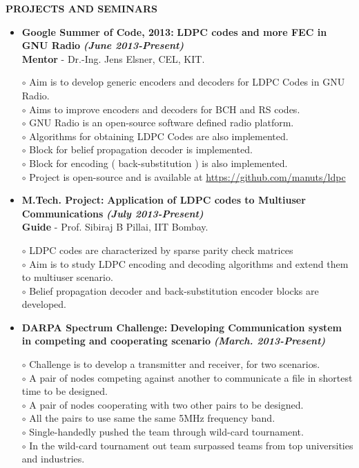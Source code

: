 \documentclass[a4paper,10pt]{article}
\begin{document}
 \colorbox{titleColor}{\parbox{6.5in}{\textbf{PROJECTS AND SEMINARS}}}

 \begin{itemize}
 \setlength{\itemsep}{1pt}
 \item \textbf{Google Summer of Code, 2013:} \textbf{LDPC codes and more FEC in GNU Radio}  \textbf \emph{(June 2013-Present)}\\
        {\textbf{Mentor} - Dr.-Ing. Jens Elsner, CEL, KIT.   }          %

        $\circ$ Aim is to develop generic encoders and decoders for LDPC Codes in GNU Radio. \\
        $\circ$ Aims to improve encoders and decoders for BCH and RS codes. \\
        $\circ$ GNU Radio is an open-source software defined radio platform. \\
        $\circ$ Algorithms for obtaining LDPC Codes are also implemented. \\
        $\circ$ Block for belief propagation decoder is implemented. \\
        $\circ$ Block for encoding ( back-substitution ) is also implemented. \\
        $\circ$ Project is open-source and is available at \url{https://github.com/manuts/ldpc}

        \item \textbf{M.Tech. Project:} \textbf{Application of LDPC codes to Multiuser Communications} \textbf \emph{(July 2013-Present)} \\
        {\textbf{Guide} - Prof. Sibiraj B Pillai, IIT Bombay.}            %
        
$\circ$ LDPC codes are characterized by sparse parity check matrices \\ 
$\circ$ Aim is to study LDPC encoding and decoding algorithms and extend them to multiuser scenario. \\
$\circ$ Belief propagation decoder and back-substitution encoder blocks are developed.

        
\item \textbf{DARPA Spectrum Challenge:} \textbf{Developing Communication system in competing and cooperating scenario}
\textbf \emph{(March. 2013-Present)}

$\circ$ Challenge is to develop a transmitter and receiver, for two scenarios. \\
$\circ$ A pair of nodes competing against another to communicate a file in shortest time to be designed. \\
$\circ$ A pair of nodes cooperating with two other pairs to be designed. \\
$\circ$ All the pairs to use same the same 5MHz frequency band. \\
$\circ$ Single-handedly pushed the team through wild-card tournament. \\
$\circ$ In the wild-card tournament out team surpassed teams from top universities and industries.


\end{itemize}
\end{document}

